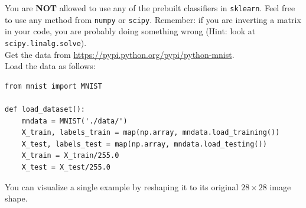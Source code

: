\documentclass{article}
\newcommand{\1}{\mathbf{1}}
\begin{document}
You are \textbf{NOT} allowed to use
any of the prebuilt  classifiers in \verb|sklearn|.  Feel free to use any method from \verb|numpy|
or \verb|scipy|. Remember: if you are inverting a matrix in your code, you are probably doing something wrong (Hint: look at \verb|scipy.linalg.solve|).\\

Get the data from \url{https://pypi.python.org/pypi/python-mnist}. \\
Load the data as follows:
\begin{verbatim}
from mnist import MNIST

def load_dataset():
    mndata = MNIST('./data/')
    X_train, labels_train = map(np.array, mndata.load_training())
    X_test, labels_test = map(np.array, mndata.load_testing())
    X_train = X_train/255.0
    X_test = X_test/255.0
\end{verbatim}
You can visualize a single example by reshaping it to its original $28 \times 28$ image shape.
\end{document}
